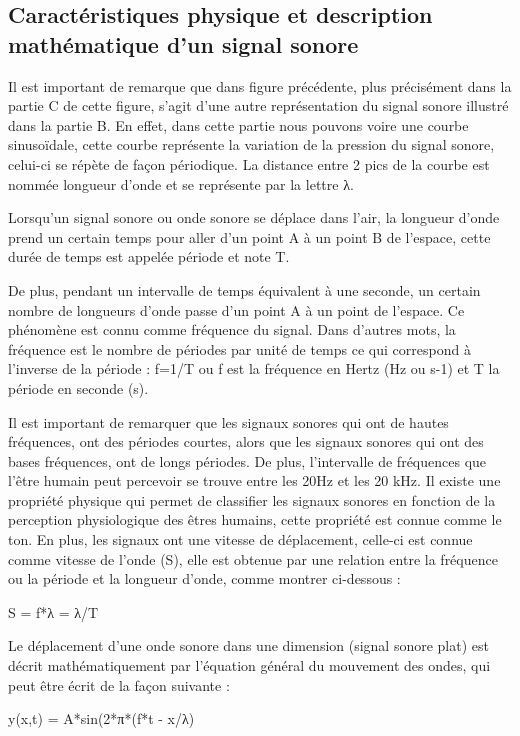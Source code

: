 \documentclass[conference,onecolumn]{IEEEtran}
\begin{document}
\subsection{Caractéristiques physique et description mathématique d’un signal sonore }

Il est important de remarque que dans figure précédente, plus précisément dans la partie C de cette figure, s’agit d’une autre représentation du signal sonore illustré dans la partie B. En effet, dans cette partie nous pouvons voire une courbe sinusoïdale, cette courbe représente la variation de la pression du signal sonore, celui-ci se répète de façon périodique. La distance entre 2 pics de la courbe est nommée longueur d’onde et se représente par la lettre λ. 

Lorsqu’un signal sonore ou onde sonore se déplace dans l’air, la longueur d’onde prend un certain temps pour aller d’un point A à un point B de l’espace, cette durée de temps est appelée période et note T. 

De plus, pendant un intervalle de temps équivalent à une seconde, un certain nombre de longueurs d’onde passe d’un point A à un point de l’espace. Ce phénomène est connu comme fréquence du signal. Dans d’autres mots, la fréquence est le nombre de périodes par unité de temps ce qui correspond à l’inverse de la période : f=1/T ou f est la fréquence en Hertz (Hz ou s-1) et T la période en seconde (s). 



Il est important de remarquer que les signaux sonores qui ont de hautes fréquences, ont des périodes courtes, alors que les signaux sonores qui ont des bases fréquences, ont de longs périodes. De plus, l’intervalle de fréquences que l’être humain peut percevoir se trouve entre les 20Hz et les 20 kHz. Il existe une propriété physique qui permet de classifier les signaux sonores en fonction de la perception physiologique des êtres humains, cette propriété est connue comme le ton. En plus, les signaux ont une vitesse de déplacement, celle-ci est connue comme vitesse de l’onde (S), elle est obtenue par une relation entre la fréquence ou la période et la longueur d’onde, comme montrer ci-dessous : 

 S = f*λ = λ/T

Le déplacement d’une onde sonore dans une dimension (signal sonore plat) est décrit mathématiquement par l’équation général du mouvement des ondes, qui peut être écrit de la façon suivante :  

 
y(x,t) = A*sin(2*π*(f*t - x/λ)
 
\end{document}
